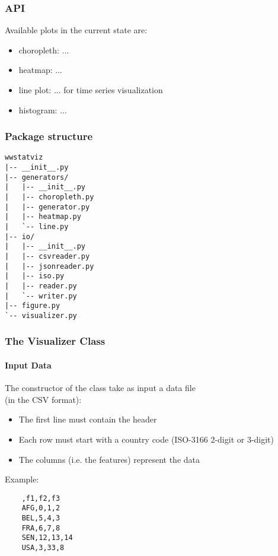 \begin{frame}
  \frametitle{API}

Available plots in the current state are:
\begin{itemize}
  \item choropleth: ...
  \item heatmap: ...
  \item line plot: ... for time series visualization
  \item histogram: ...
\end{itemize}
\end{frame}

\begin{frame}[fragile,shrink=30]
  \frametitle{Package structure}
\begin{verbatim}
wwstatviz
|-- __init__.py
|-- generators/
|   |-- __init__.py
|   |-- choropleth.py
|   |-- generator.py
|   |-- heatmap.py
|   `-- line.py
|-- io/
|   |-- __init__.py
|   |-- csvreader.py
|   |-- jsonreader.py
|   |-- iso.py
|   |-- reader.py
|   `-- writer.py
|-- figure.py
`-- visualizer.py
\end{verbatim}
\end{frame}

\begin{frame}[fragile,shrink=10]
  \frametitle{The Visualizer Class}
  \framesubtitle{Input Data}
  
  The constructor of the class take as input a data file \\
  (in the CSV format):
  \begin{itemize}
    \item The first line must contain the header
    \item Each row must start with a country code (ISO-3166 2-digit or 3-digit)
    \item The columns (i.e. the features) represent the data
  \end{itemize}
  
  \vspace{5mm}
  
  Example:
  \begin{verbatim}
    ,f1,f2,f3
    AFG,0,1,2
    BEL,5,4,3
    FRA,6,7,8
    SEN,12,13,14
    USA,3,33,8
  \end{verbatim}

\end{frame}

